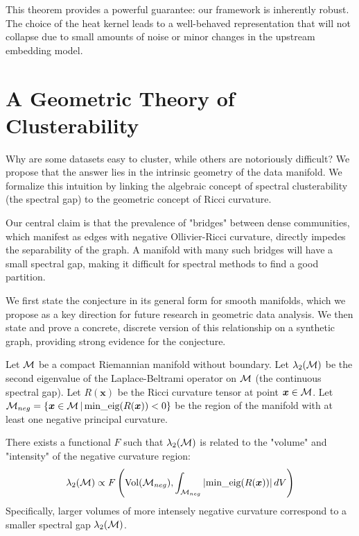 This theorem provides a powerful guarantee: our framework is inherently robust. The choice of the heat kernel leads to a well-behaved representation that will not collapse due to small amounts of noise or minor changes in the upstream embedding model.

\section{A Geometric Theory of Clusterability}
\label{sec:clusterability_theory}
Why are some datasets easy to cluster, while others are notoriously difficult? We propose that the answer lies in the intrinsic geometry of the data manifold. We formalize this intuition by linking the algebraic concept of spectral clusterability (the spectral gap) to the geometric concept of Ricci curvature.

Our central claim is that the prevalence of "bridges" between dense communities, which manifest as edges with negative Ollivier-Ricci curvature, directly impedes the separability of the graph. A manifold with many such bridges will have a small spectral gap, making it difficult for spectral methods to find a good partition.

We first state the conjecture in its general form for smooth manifolds, which we propose as a key direction for future research in geometric data analysis. We then state and prove a concrete, discrete version of this relationship on a synthetic graph, providing strong evidence for the conjecture.

\begin{conjecture}
\label{conj:clusterability_full}
Let $\mathcal{M}$ be a compact Riemannian manifold without boundary. Let $\lambda_2(\mathcal{M})$ be the second eigenvalue of the Laplace-Beltrami operator on $\mathcal{M}$ (the continuous spectral gap). Let $R(\bm{x})$ be the Ricci curvature tensor at point $\bm{x} \in \mathcal{M}$. Let $\mathcal{M}_{neg} = \{\bm{x} \in \mathcal{M} \,|\, \text{min\_eig}(R(\bm{x})) < 0\}$ be the region of the manifold with at least one negative principal curvature.

There exists a functional $F$ such that $\lambda_2(\mathcal{M})$ is related to the "volume" and "intensity" of the negative curvature region:
\begin{equation}
    \lambda_2(\mathcal{M}) \propto F\left( \text{Vol}(\mathcal{M}_{neg}), \int_{\mathcal{M}_{neg}} |\text{min\_eig}(R(\bm{x}))| \, dV \right)
\end{equation}
Specifically, larger volumes of more intensely negative curvature correspond to a smaller spectral gap $\lambda_2(\mathcal{M})$.
\end{conjecture}

